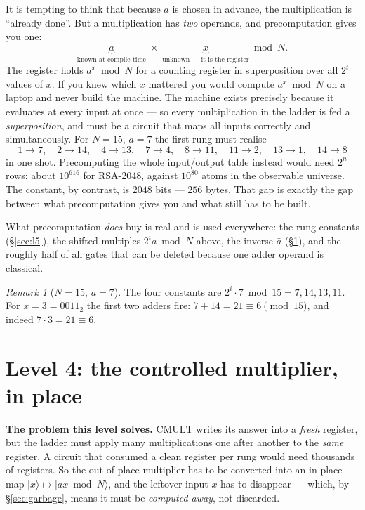 \documentclass[11pt]{article}
\renewcommand{\ket}[1]{\lvert #1 \rangle}
\newcommand{\CMULT}{\mathrm{CMULT}}
\theoremstyle{plain}
\theoremstyle{remark}
\newtheorem*{remark}{Remark}
\begin{document}
\begin{keybox}[title={The constant is known; the operand is not}]
It is tempting to think that because $a$ is chosen in advance, the multiplication is ``already
done''. But a multiplication has \emph{two} operands, and precomputation gives you one:
\[
\underbrace{a}_{\text{known at compile time}}\;\times\;\underbrace{x}_{\text{unknown --- it is the register}}\bmod N .
\]
The register holds $a^x\bmod N$ for a counting register in superposition over all $2^t$ values of
$x$. If you knew which $x$ mattered you would compute $a^x\bmod N$ on a laptop and never build the
machine. The machine exists precisely because it evaluates at every input at once --- so every
multiplication in the ladder is fed a \emph{superposition}, and must be a circuit that maps all
inputs correctly and simultaneously. For $N=15$, $a=7$ the first rung must realise
\[
1\!\to\!7,\quad 2\!\to\!14,\quad 4\!\to\!13,\quad 7\!\to\!4,\quad
8\!\to\!11,\quad 11\!\to\!2,\quad 13\!\to\!1,\quad 14\!\to\!8
\]
in one shot. Precomputing the whole input/output table instead would need $2^n$ rows: about
$10^{616}$ for RSA-2048, against $10^{80}$ atoms in the observable universe. The constant, by
contrast, is $2048$ bits --- $256$ bytes. That gap is exactly the gap between what precomputation
gives you and what still has to be built.

What precomputation \emph{does} buy is real and is used everywhere: the rung constants
(\S\ref{sec:l5}), the shifted multiples $2^ia\bmod N$ above, the inverse $\bar a$
(\S\ref{sec:l4}), and the roughly half of all gates that can be deleted because one adder operand
is classical.
\end{keybox}

\begin{remark}[$N=15$, $a=7$]
The four constants are $2^i\cdot7\bmod15=7,14,13,11$. For $x=3=0011_2$ the first two adders fire:
$7+14=21\equiv6\pmod{15}$, and indeed $7\cdot3=21\equiv6$.
\end{remark}

\section{Level 4: the controlled multiplier, in place}\label{sec:l4}

\textbf{The problem this level solves.} $\CMULT$ writes its answer into a \emph{fresh} register,
but the ladder must apply many multiplications one after another to the \emph{same} register. A
circuit that consumed a clean register per rung would need thousands of registers. So the
out-of-place multiplier has to be converted into an in-place map $\ket x\mapsto\ket{ax\bmod N}$,
and the leftover input $x$ has to disappear --- which, by \S\ref{sec:garbage}, means it must be
\emph{computed away}, not discarded.
\end{document}
